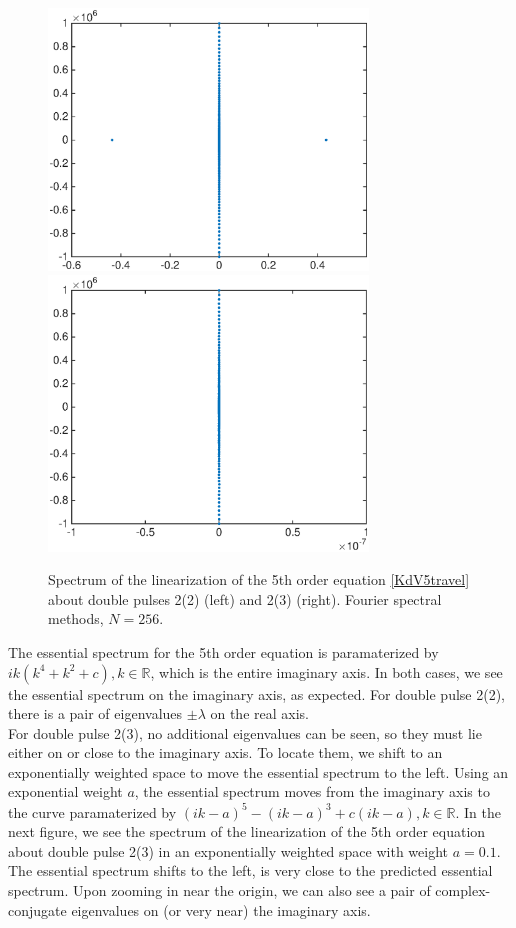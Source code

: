 \documentclass[12pt]{article}
\def\R{{\mathbb R}}
\begin{document}
\begin{figure}[H]
	\includegraphics[width=8.5cm]{four10ud2_2}
	\includegraphics[width=8.5cm]{four10ud2_3}
	\caption{Spectrum of the linearization of the 5th order equation \eqref{KdV5travel} about double pulses 2(2) (left) and 2(3) (right). Fourier spectral methods, $N = 256$.}
\end{figure}

The essential spectrum for the 5th order equation is paramaterized by $ik(k^4 + k^2 + c), k \in \R$, which is the entire imaginary axis. In both cases, we see the essential spectrum on the imaginary axis, as expected. For double pulse 2(2), there is a pair of eigenvalues $\pm \lambda$ on the real axis.\\

For double pulse 2(3), no additional eigenvalues can be seen, so they must lie either on or close to the imaginary axis. To locate them, we shift to an exponentially weighted space to move the essential spectrum to the left. Using an exponential weight $a$, the essential spectrum moves from the imaginary axis to the curve paramaterized by $(i k - a)^5 - (i k - a)^3 + c(i k - a), k \in \R$. In the next figure, we see the spectrum of the linearization of the 5th order equation about double pulse 2(3) in an exponentially weighted space with weight $a = 0.1$. The essential spectrum shifts to the left, is very close to the predicted essential spectrum. Upon zooming in near the origin, we can also see a pair of complex-conjugate eigenvalues on (or very near) the imaginary axis.
\end{document}
